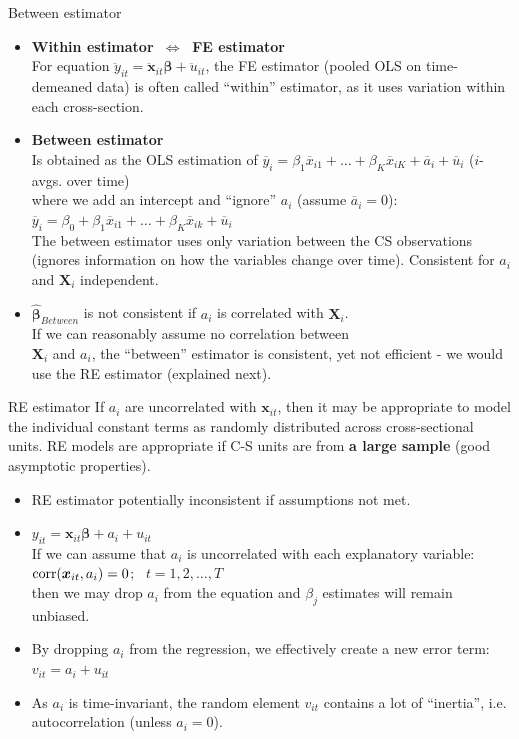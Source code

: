\documentclass[usenames,dvipsnames]{beamer}
\begin{document}
\begin{frame}{Between estimator}
\small
\begin{itemize}
\item \textbf{Within estimator $~\Longleftrightarrow~$ FE estimator}\\
For equation  $\ddot{y}_{it} = \bm{\ddot{x}}_{it} \bm{\beta} + \ddot{u}_{it}$, the FE estimator (pooled OLS on time-demeaned data) is often called ``within'' estimator, as it uses variation within each cross-section.
\bigskip
\item \textbf{Between estimator}\\
Is obtained as the OLS estimation of $\overline{y}_i = \beta_1 \overline{x}_{i1} + \dots + \beta_K \overline{x}_{iK} + \overline{a}_i + \overline{u}_i$ \qquad ($i$-avgs. over time) \\where we add an intercept and ``ignore'' $a_i$ (assume $\overline{a}_i=0$):\\ \medskip
$\overline{y}_i = \beta_0 + \beta_1 \overline{x}_{i1} + \dots + \beta_K \overline{x}_{ik} +  \overline{u}_i$
\medskip
\\The between estimator uses only variation between the CS observations (ignores information on how the variables change over time). Consistent for $a_i$ and $\bm{X}_i$ independent.\\
\bigskip
\item $\bm{\hat{\beta}}_{\textit{Between}}$ is not consistent if $a_i$ is correlated with $\bm{X}_i$. \\If we can reasonably assume no correlation between \\$\bm{X}_i$ and $a_i$, the ``between'' estimator is consistent, yet not efficient - we would use the RE estimator (explained next). 
\end{itemize}
\end{frame}
\begin{frame}{RE estimator}
\small 
If $a_i$ are uncorrelated with $\bm{x}_{it}$, then it may be appropriate to model the individual constant terms as randomly distributed across cross-sectional units. RE models are appropriate if C-S units are from \textbf{a large sample} (good asymptotic properties).
\bigskip
\begin{itemize}
\item RE estimator potentially inconsistent if assumptions not met.
\item $y_{it} = \bm{x}_{it} \bm{\beta} + a_i + u_{it}$\\ \medskip
If we can assume that $a_i$ is uncorrelated with each explanatory variable: $\textnormal{corr}(\bm{x}_{it}, a_i) = 0$; \ $t = 1,2, \dots, T$ \\then we may drop $a_i$ from the equation and $\beta_j$ estimates will remain unbiased.\\
\item By dropping $a_i$ from the regression, we effectively create a new error term: $v_{it} = a_i + u_{it}$\\
\medskip
\item As $a_i$ is time-invariant, the random element $v_{it}$ contains a lot of ``inertia'', i.e. autocorrelation (unless $a_i = 0$).
\end{itemize}
\end{frame}
\end{document}
